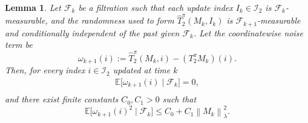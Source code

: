 \documentclass[accepted]{uai2026}
\theoremstyle{plain}
\newtheorem{lemma}[theorem]{Lemma}
\theoremstyle{definition}
\theoremstyle{remark}
\newcommand{\E}{\mathbb{E}}
\newcommand{\LVert}{\left\lVert}
\newcommand{\RVert}{\right\rVert}
\newcommand{\1}{\mathbbm{1}}
\begin{document}
\begin{lemma}\label{lem:noises}
Let $\mathcal{F}_k$ be a filtration such that each update index $I_k \in \mathcal{I}_2$ is $\mathcal{F}_k$-measurable, and the randomness used to form $\hat{T}^\pi_2(M_k, I_k)$ is $\mathcal{F}_{k+1}$-measurable and conditionally independent of the past given $\mathcal{F}_k$. Let the coordinatewise noise term be 
\begin{equation}
\omega_{k+1}(i) := \hat{T}^\pi_2(M_k, i) - (T^\pi_2M_k)(i).
\end{equation}
Then, for every index $i \in \mathcal{I}_2$ updated at time $k$
\begin{equation}\label{eq:noisemean}
\begin{gathered}
\E\big[\omega_{k+1}(i)\mid \mathcal{F}_k \big] = 0,\\
\end{gathered}
\end{equation}
and there exist finite constants $C_0, C_1>0$ such that
\begin{equation}\label{eq:noise2}
\E\big[\omega_{k+1}(i)^2\mid \mathcal{F}_k \big] \le C_0 + C_1 \LVert M_k \RVert_\lambda^2.
\end{equation}
\end{lemma}
\end{document}

